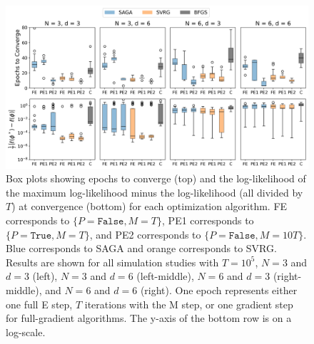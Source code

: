 %
\begin{figure}
    \centering
    \includegraphics[width=6.5in]{../plt/boxplots_sim_T_100000.png}
    \caption{Box plots showing epochs to converge (top) and the log-likelihood of the maximum log-likelihood minus the log-likelihood (all divided by $T$) at convergence (bottom) for each optimization algorithm. FE corresponds to $\{P = \texttt{False}, M = T\}$, PE1 corresponds to $\{P = \texttt{True}, M = T\}$, and PE2 corresponds to $\{P = \texttt{False}, M = 10T\}$. Blue corresponds to SAGA and orange corresponds to SVRG. Results are shown for all simulation studies with $T=10^{5}$, $N=3$ and $d=3$ (left), $N=3$ and $d=6$ (left-middle), $N=6$ and $d=3$ (right-middle), and $N=6$ and $d=6$ (right). One epoch represents either one full E step, $T$ iterations with the M step, or one gradient step for full-gradient algorithms. The y-axis of the bottom row is on a log-scale.}
    \label{fig:boxplots_sim}
\end{figure}
%
